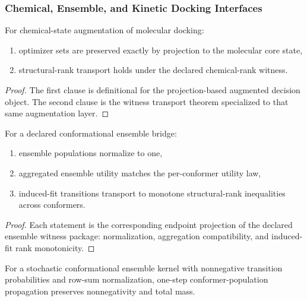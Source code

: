 \subsubsection{Chemical, Ensemble, and Kinetic Docking Interfaces}

\begin{theorem}\label{thm:chemical-augmented-docking-transport}
For chemical-state augmentation of molecular docking:
\begin{enumerate}
\item optimizer sets are preserved exactly by projection to the molecular core state,
\item structural-rank transport holds under the declared chemical-rank witness.
\end{enumerate}
\end{theorem}

\begin{proof}
The first clause is definitional for the projection-based augmented decision object. The second clause is the witness transport theorem specialized to that same augmentation layer.
\end{proof}

\begin{theorem}\label{thm:conformational-ensemble-docking-transport}
For a declared conformational ensemble bridge:
\begin{enumerate}
\item ensemble populations normalize to one,
\item aggregated ensemble utility matches the per-conformer utility law,
\item induced-fit transitions transport to monotone structural-rank inequalities across conformers.
\end{enumerate}
\end{theorem}

\begin{proof}
Each statement is the corresponding endpoint projection of the declared ensemble witness package: normalization, aggregation compatibility, and induced-fit rank monotonicity.
\end{proof}

\begin{theorem}\label{thm:ensemble-one-step-population-transport}
For a stochastic conformational ensemble kernel with nonnegative transition probabilities and row-sum normalization, one-step conformer-population propagation preserves nonnegativity and total mass.
\end{theorem}


